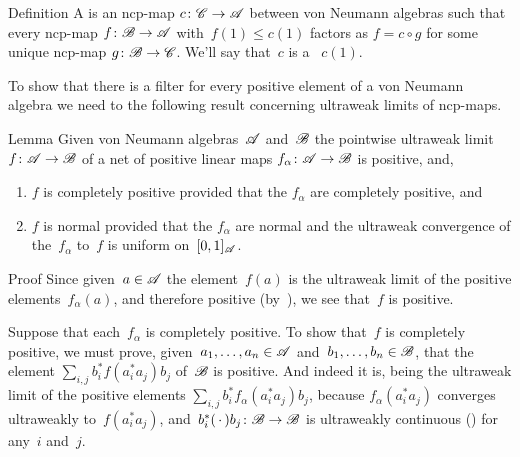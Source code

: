 \documentclass[a]{subfiles}
\begin{document}
\begin{parsec}%
\begin{point}[filter]{Definition}%
A %
is an ncp-map $c\colon \mathscr{C}\to\mathscr{A}$
between von Neumann algebras
such that every ncp-map $f\colon \mathscr{B}\to\mathscr{A}$
with~$f(1)\leq c(1)$
factors as $f=c\circ g$
for some unique ncp-map $g \colon \mathscr{B}\to\mathscr{C}$.
We'll say that~$c$ is a ~$c(1)$.
\end{point}
\begin{point}%
To show that there is a filter
for every positive element of a von Neumann algebra
we need to the following result
concerning ultraweak limits of ncp-maps.
\end{point}
\begin{point}{Lemma}%
Given von Neumann algebras~$\mathscr{A}$
and~$\mathscr{B}$
the pointwise ultraweak limit
$f\colon \mathscr{A}\to\mathscr{B}$
of a net of  positive linear maps $f_\alpha\colon \mathscr{A}\to\mathscr{B}$
is positive, and, 
\begin{enumerate}
\item
$f$ is completely positive provided
that the $f_\alpha$ are completely positive, and
\item
$f$ is normal provided that the $f_\alpha$ are normal
and the ultraweak convergence of the~$f_\alpha$ to~$f$
is uniform on~$[0,1]_{\mathscr{A}}$.
\end{enumerate}
\begin{point}{Proof}%
Since given~$a\in \mathscr{A}$ the element~$f(a)$
is the ultraweak limit of the positive elements~$f_\alpha(a)$,
and therefore positive (by~),
we see that~$f$ is positive.

Suppose that each~$f_\alpha$ is completely positive.
To show that~$f$ is completely positive,
we must prove, given~$a_1,\dotsc,a_n\in\mathscr{A}$
and~$b_1,\dotsc,b_n\in\mathscr{B}$,
that 
the element $\sum_{i,j} b_i^* f(a_i^*a_j)b_j$
of~$\mathscr{B}$
is positive.
And indeed it is,
being the ultraweak limit of
the positive elements $\sum_{i,j} b_i^* f_\alpha (a_i^* a_j)b_j$,
because  $f_\alpha(a_i^* a_j)$
converges ultraweakly to~$f(a_i^* a_j)$,
and~$b_i^*(\,\cdot\,)b_j\colon \mathscr{B}\to\mathscr{B}$
is ultraweakly continuous
()
for any~$i$ and~$j$.


\end{point}
\end{point}
\end{parsec}
\end{document}
